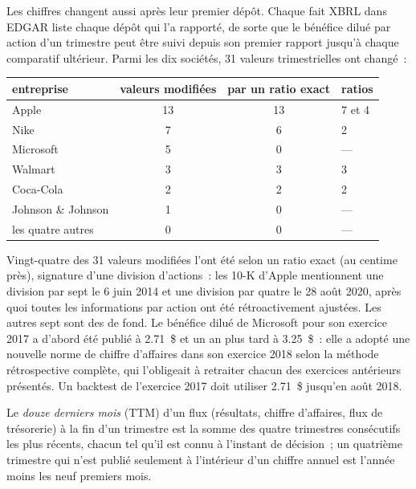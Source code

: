 Les chiffres changent aussi après leur premier dépôt. Chaque fait XBRL dans EDGAR liste chaque dépôt qui l'a rapporté, de sorte que le
bénéfice dilué par action d'un trimestre peut être suivi depuis son premier rapport jusqu'à chaque comparatif ultérieur. Parmi les dix sociétés, 31
valeurs trimestrielles ont changé~:

\begin{center}
\small
\begin{tabular}{@{}lccl@{}}
\toprule
entreprise & valeurs modifiées & par un ratio exact & ratios\\
\midrule
Apple & 13 & 13 & 7 et 4\\
Nike & 7 & 6 & 2\\
Microsoft & 5 & 0 & ---\\
Walmart & 3 & 3 & 3\\
Coca-Cola & 2 & 2 & 2\\
Johnson \& Johnson & 1 & 0 & ---\\
les quatre autres & 0 & 0 & ---\\
\bottomrule
\end{tabular}
\end{center}

Vingt-quatre des 31 valeurs modifiées l'ont été selon un ratio exact (au centime près), signature d'une division d'actions~: les 10-K d'Apple mentionnent une division par sept
le 6 juin 2014 et une division par quatre le 28 août 2020, après quoi toutes les informations par action ont été rétroactivement ajustées. Les autres
sept sont des  de fond. Le bénéfice dilué de Microsoft pour son exercice 2017 a d'abord été publié à 2.71~\$ et un an
plus tard à 3.25~\$~: elle a adopté une nouvelle norme de chiffre d'affaires dans son exercice 2018 selon la méthode rétrospective complète, qui l'obligeait à retraiter
chacun des exercices antérieurs présentés. Un backtest de l'exercice 2017 doit utiliser 2.71~\$ jusqu'en août 2018.

\begin{definition}\label{def:rs:fundamental-analyst-and-event-features:ttm}
Le \emph{douze derniers mois} (TTM) d'un flux (résultats, chiffre d'affaires, flux de trésorerie) à la fin d'un trimestre est
la somme des quatre trimestres consécutifs les plus récents, chacun tel qu'il est connu à l'instant de décision~; un quatrième trimestre qui n'est publié seulement à l'intérieur
d'un chiffre annuel est l'année moins les neuf premiers mois.
\end{definition}

